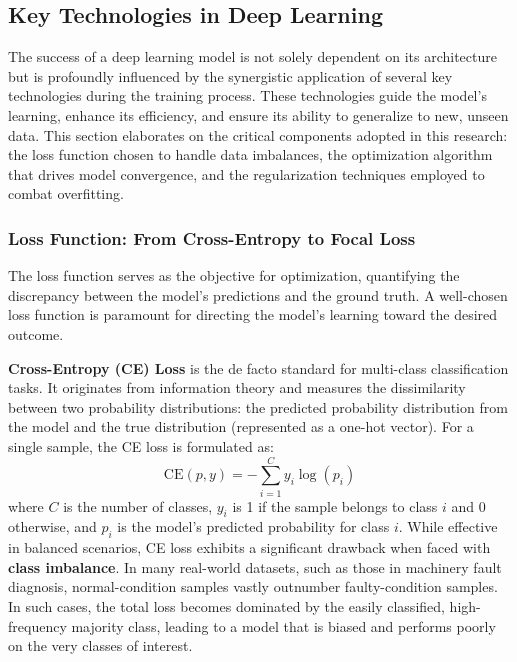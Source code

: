 

\subsection{Key Technologies in Deep Learning}
\label{sec:key_technologies}

The success of a deep learning model is not solely dependent on its architecture but is profoundly influenced by the synergistic application of several key technologies during the training process. These technologies guide the model's learning, enhance its efficiency, and ensure its ability to generalize to new, unseen data. This section elaborates on the critical components adopted in this research: the loss function chosen to handle data imbalances, the optimization algorithm that drives model convergence, and the regularization techniques employed to combat overfitting.

\subsubsection{Loss Function: From Cross-Entropy to Focal Loss}
\label{sec:loss_functions}

The loss function serves as the objective for optimization, quantifying the discrepancy between the model's predictions and the ground truth. A well-chosen loss function is paramount for directing the model's learning toward the desired outcome.

\textbf{Cross-Entropy (CE) Loss} is the de facto standard for multi-class classification tasks. It originates from information theory and measures the dissimilarity between two probability distributions: the predicted probability distribution from the model and the true distribution (represented as a one-hot vector). For a single sample, the CE loss is formulated as:
\begin{equation}
\text{CE}(p, y) = - \sum_{i=1}^{C} y_i \log(p_i)
\label{eq:ce_loss}
\end{equation}
where $C$ is the number of classes, $y_i$ is 1 if the sample belongs to class $i$ and 0 otherwise, and $p_i$ is the model's predicted probability for class $i$. While effective in balanced scenarios, CE loss exhibits a significant drawback when faced with \textbf{class imbalance}. In many real-world datasets, such as those in machinery fault diagnosis, normal-condition samples vastly outnumber faulty-condition samples. In such cases, the total loss becomes dominated by the easily classified, high-frequency majority class, leading to a model that is biased and performs poorly on the very classes of interest.

